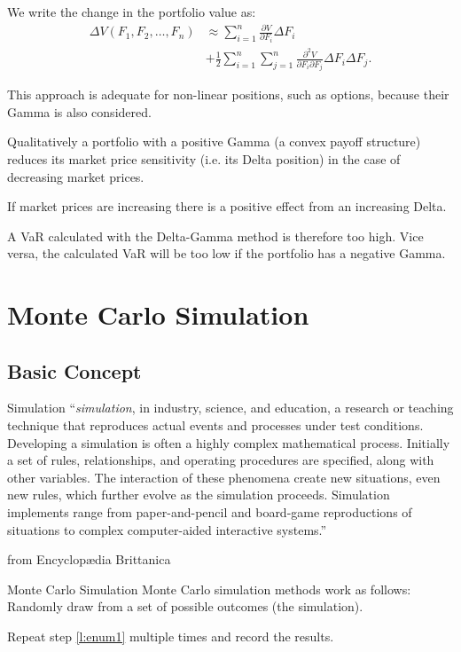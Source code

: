 	We write the change in the portfolio value as:
		\begin{align*}
			\Delta V(F_1,F_2,\ldots,F_n)& \approx \sum_{i=1}^n \frac{\partial V}{\partial F_i} \Delta F_i \\
			&+ \frac 1 2 \sum_{i=1}^n \sum_{j=1}^n \frac{\partial^2 V}{\partial F_i \partial F_j} \Delta F_i \Delta F_j.
		\end{align*}

	This approach is adequate for non-linear positions, such as options, because their Gamma is also considered.
	
	Qualitatively a portfolio with a positive Gamma (a convex payoff structure) reduces its 
	market price sensitivity (i.e. its Delta position) in the case of decreasing market prices.
	
	If market prices are increasing there is a positive effect from an increasing Delta.
	
	A VaR calculated with the Delta-Gamma method is therefore too high. Vice versa, the 
	calculated VaR will be too low if the portfolio has a negative Gamma.


\section{Monte Carlo Simulation}
\subsection{Basic Concept}

Simulation
	``\emph{simulation},  in industry, science, and education, a research or
	teaching technique that reproduces actual events and processes under test conditions.
	Developing a simulation is often a highly complex mathematical process.
	Initially a set of rules, relationships, and operating procedures are
	specified, along with other variables. The interaction of these phenomena
	create new situations, even new rules, which further evolve as the simulation
	proceeds. Simulation implements range from paper-and-pencil and board-game
	reproductions of situations to complex computer-aided interactive systems.''

	from Encyclop{\ae}dia Brittanica



Monte Carlo Simulation
	Monte Carlo simulation methods work as follows:
		\label{l:enum1} Randomly draw from a set of possible outcomes (the
		simulation).
		
		Repeat step \ref{l:enum1} multiple times and record the results.
		
